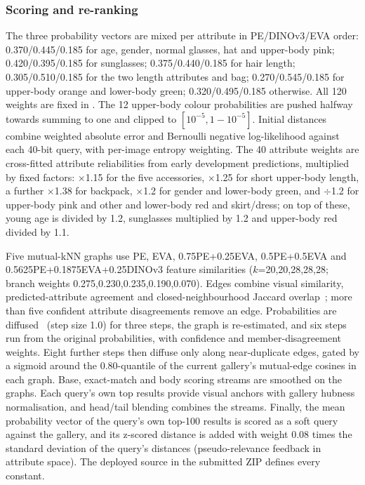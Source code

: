 \documentclass[a4paper, 10pt, conference]{ieeeconf}
\begin{document}
\subsubsection{Scoring and re-ranking}
The three probability vectors are mixed per attribute in PE/DINOv3/EVA order: 0.370/0.445/0.185 for age, gender, normal glasses, hat and upper-body pink; 0.420/0.395/0.185 for sunglasses; 0.375/0.440/0.185 for hair length; 0.305/0.510/0.185 for the two length attributes and bag; 0.270/0.545/0.185 for upper-body orange and lower-body green; 0.320/0.495/0.185 otherwise. All 120 weights are fixed in . The 12 upper-body colour probabilities are pushed halfway towards summing to one and clipped to $[10^{-5},1-10^{-5}]$. Initial distances combine weighted absolute error and Bernoulli negative log-likelihood against each 40-bit query, with per-image entropy weighting. The 40 attribute weights are cross-fitted attribute reliabilities from early development predictions, multiplied by fixed factors: $\times$1.15 for the five accessories, $\times$1.25 for short upper-body length, a further $\times$1.38 for backpack, $\times$1.2 for gender and lower-body green, and $\div$1.2 for upper-body pink and other and lower-body red and skirt/dress; on top of these, young age is divided by 1.2, sunglasses multiplied by 1.2 and upper-body red divided by 1.1.

Five mutual-kNN graphs use PE, EVA, 0.75PE+0.25EVA, 0.5PE+0.5EVA and 0.5625PE+0.1875EVA+0.25DINOv3 feature similarities ($k$=20,20,28,28,28; branch weights 0.275,0.230,0.235,0.190,0.070). Edges combine visual similarity, predicted-attribute agreement and closed-neighbourhood Jaccard overlap~\cite{Zhong:2017}; more than five confident attribute disagreements remove an edge. Probabilities are diffused~\cite{Zhou:2004} (step size 1.0) for three steps, the graph is re-estimated, and six steps run from the original probabilities, with confidence and member-disagreement weights. Eight further steps then diffuse only along near-duplicate edges, gated by a sigmoid around the 0.80-quantile of the current gallery's mutual-edge cosines in each graph. Base, exact-match and body scoring streams are smoothed on the graphs. Each query's own top results provide visual anchors with gallery hubness normalisation, and head/tail blending combines the streams. Finally, the mean probability vector of the query's own top-100 results is scored as a soft query against the gallery, and its z-scored distance is added with weight 0.08 times the standard deviation of the query's distances (pseudo-relevance feedback in attribute space). The deployed source  in the submitted ZIP defines every constant.
\end{document}
